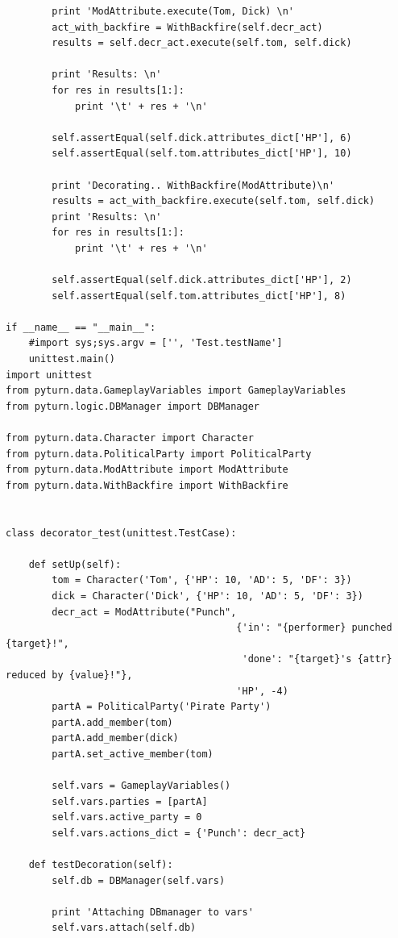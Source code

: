\documentclass[11pt]{report}
\begin{document}
\begin{verbatim}
        print 'ModAttribute.execute(Tom, Dick) \n'
        act_with_backfire = WithBackfire(self.decr_act)
        results = self.decr_act.execute(self.tom, self.dick)
        
        print 'Results: \n'
        for res in results[1:]:
            print '\t' + res + '\n'
        
        self.assertEqual(self.dick.attributes_dict['HP'], 6)
        self.assertEqual(self.tom.attributes_dict['HP'], 10)

        print 'Decorating.. WithBackfire(ModAttribute)\n'
        results = act_with_backfire.execute(self.tom, self.dick)
        print 'Results: \n'
        for res in results[1:]:
            print '\t' + res + '\n'
            
        self.assertEqual(self.dick.attributes_dict['HP'], 2)
        self.assertEqual(self.tom.attributes_dict['HP'], 8)

if __name__ == "__main__":
    #import sys;sys.argv = ['', 'Test.testName']
    unittest.main()
import unittest
from pyturn.data.GameplayVariables import GameplayVariables
from pyturn.logic.DBManager import DBManager

from pyturn.data.Character import Character
from pyturn.data.PoliticalParty import PoliticalParty
from pyturn.data.ModAttribute import ModAttribute
from pyturn.data.WithBackfire import WithBackfire


class decorator_test(unittest.TestCase):

    def setUp(self):
        tom = Character('Tom', {'HP': 10, 'AD': 5, 'DF': 3})
        dick = Character('Dick', {'HP': 10, 'AD': 5, 'DF': 3})
        decr_act = ModAttribute("Punch",
                                        {'in': "{performer} punched {target}!",
                                         'done': "{target}'s {attr} reduced by {value}!"},
                                        'HP', -4)
        partA = PoliticalParty('Pirate Party')
        partA.add_member(tom)
        partA.add_member(dick)
        partA.set_active_member(tom)
                
        self.vars = GameplayVariables()
        self.vars.parties = [partA]
        self.vars.active_party = 0
        self.vars.actions_dict = {'Punch': decr_act}
        
    def testDecoration(self):
        self.db = DBManager(self.vars)
        
        print 'Attaching DBmanager to vars'
        self.vars.attach(self.db)
        

\end{verbatim}
\end{document}
